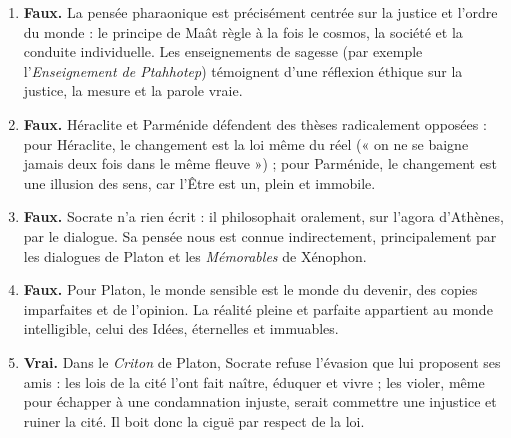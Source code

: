 \documentclass[11pt]{article}
\newcommand{\cle}[1]{{\popxbold\color{popdark}#1}}
\begin{document}
\begin{corrige}
\begin{enumerate}
\item \textbf{Faux.} La pensée pharaonique est précisément centrée sur la justice et l'ordre du monde : le principe de \cle{Maât} règle à la fois le cosmos, la société et la conduite individuelle. Les enseignements de sagesse (par exemple l'\emph{Enseignement de Ptahhotep}) témoignent d'une réflexion éthique sur la justice, la mesure et la parole vraie.
\item \textbf{Faux.} Héraclite et Parménide défendent des thèses radicalement opposées : pour Héraclite, le changement est la loi même du réel (« on ne se baigne jamais deux fois dans le même fleuve ») ; pour Parménide, le changement est une illusion des sens, car l'Être est un, plein et immobile.
\item \textbf{Faux.} Socrate n'a rien écrit : il philosophait oralement, sur l'agora d'Athènes, par le dialogue. Sa pensée nous est connue indirectement, principalement par les dialogues de Platon et les \emph{Mémorables} de Xénophon.
\item \textbf{Faux.} Pour Platon, le monde sensible est le monde du devenir, des copies imparfaites et de l'opinion. La réalité pleine et parfaite appartient au monde intelligible, celui des \cle{Idées}, éternelles et immuables.
\item \textbf{Vrai.} Dans le \emph{Criton} de Platon, Socrate refuse l'évasion que lui proposent ses amis : les lois de la cité l'ont fait naître, éduquer et vivre ; les violer, même pour échapper à une condamnation injuste, serait commettre une injustice et ruiner la cité. Il boit donc la ciguë par respect de la loi.
\end{enumerate}
\end{corrige}
\end{document}
